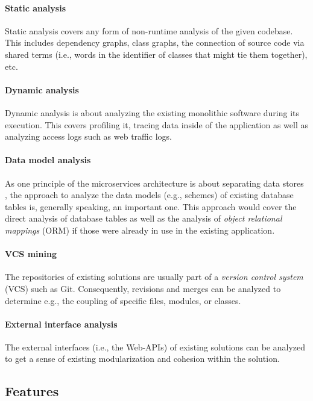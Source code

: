 \documentclass[12pt,a4paper]{report}
\begin{document}
\paragraph{Static analysis}
Static analysis covers any form of non\hyp runtime analysis of the given codebase.
This includes dependency graphs, class graphs, the connection of source code via
shared terms (i.e., words in the identifier of classes that might tie them
together), etc.

\paragraph{Dynamic analysis}
Dynamic analysis is about
analyzing the existing monolithic software during its execution. This covers
profiling it, tracing data inside of the application as well as analyzing
access logs such as web traffic logs.

\paragraph{Data model analysis}
As one principle of the microservices architecture is about separating data stores
\cite{ms-microservices}, the approach to analyze the data models (e.g.,
schemes) of existing database tables is, generally speaking, an important one.
This approach would cover the direct analysis of database tables as well as the
analysis of \textit{object relational mappings} (ORM) if those were already in
use in the existing application.

\paragraph{VCS mining}
The repositories of
existing solutions are usually part of a \textit{version control system} (VCS)
such as Git. Consequently, revisions and merges can be analyzed to determine
e.g., the coupling of specific files, modules, or classes.

\paragraph{External interface analysis}
The external interfaces (i.e., the Web-APIs) of existing
solutions can be analyzed to get a sense of existing modularization and
cohesion within the solution.


\subsection*{Features}
\end{document}
